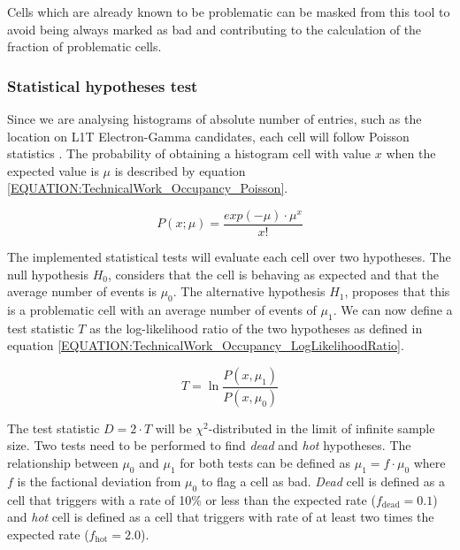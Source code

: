 Cells which are already known to be problematic can be masked from this tool to avoid being always marked as bad and contributing to the calculation of the fraction of problematic cells.

\subsubsection{Statistical hypotheses test}


Since we are analysing histograms of absolute number of entries, such as the location on \gls{L1T} Electron-Gamma candidates, each cell will follow Poisson statistics \cite{BOOK:AppliedStatisticsAndProbabilityforEngineers}. The probability of obtaining a histogram cell with value $x$ when the expected value is $\mu$ is described by equation \ref{EQUATION:TechnicalWork_Occupancy_Poisson}.

\begin{equation}
P(x;\mu)=\frac{exp(-\mu) \cdot \mu^{x}}{x!}
\label{EQUATION:TechnicalWork_Occupancy_Poisson}
\end{equation}

The implemented statistical tests will evaluate each cell over two hypotheses. The null hypothesis $H_0$, considers that the cell is behaving as expected and that the average number of events is $\mu_0$. The alternative hypothesis $H_1$, proposes that this is a problematic cell with an average number of events of $\mu_1$. We can now define a test statistic $T$ as the log-likelihood ratio of the two hypotheses as defined in equation \ref{EQUATION:TechnicalWork_Occupancy_LogLikelihoodRatio}.

\begin{equation}
T=\ln\frac{P(x,\mu_1)}{P(x,\mu_0)}
\label{EQUATION:TechnicalWork_Occupancy_LogLikelihoodRatio}
\end{equation}

The test statistic $D=2 \cdot T$ will be $\chi^2$-distributed in the limit of infinite sample size. Two tests need to be performed to find \textit{dead} and \textit{hot} hypotheses. The relationship between $\mu_0$ and $\mu_1$ for both tests can be defined as $\mu_1=f \cdot \mu_0$ where $f$ is the factional deviation from $\mu_0$ to flag a cell as bad. \textit{Dead} cell is defined as a cell that triggers with a rate of 10\% or less than the expected rate ($f_{\text{dead}}=0.1$) and \textit{hot} cell is defined as a cell that triggers with rate of at least two times the expected rate ($f_{\text{hot}}=2.0$).

